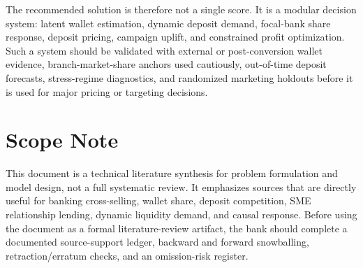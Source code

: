 \documentclass[11pt]{article}
\begin{document}
The recommended solution is therefore not a single score. It is a modular
decision system: latent wallet estimation, dynamic deposit demand,
focal-bank share response, deposit pricing, campaign uplift, and constrained
profit optimization. Such a system should be validated with external or
post-conversion wallet evidence, branch-market-share anchors used cautiously,
out-of-time deposit forecasts, stress-regime diagnostics, and randomized
marketing holdouts before it is used for major pricing or targeting decisions.

\section*{Scope Note}

This document is a technical literature synthesis for problem formulation and
model design, not a full systematic review. It emphasizes sources that are
directly useful for banking cross-selling, wallet share, deposit competition,
SME relationship lending, dynamic liquidity demand, and causal response. Before
using the document as a formal literature-review artifact, the bank should
complete a documented source-support ledger, backward and forward snowballing,
retraction/erratum checks, and an omission-risk register.



\end{document}
